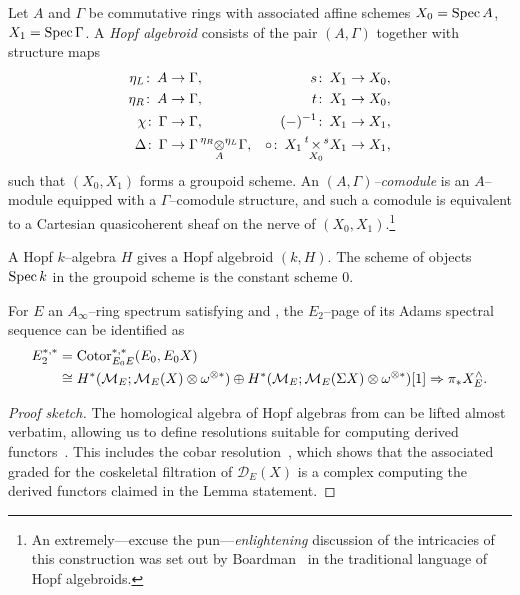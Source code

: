 \begin{definition}\label{FHGivesComodules}
Let \(A\) and \(\Gamma\) be commutative rings with associated affine schemes \(X_0 = \operatorname{Spec} A\), \(X_1 = \operatorname{Spec} \Gamma\).  A \textit{Hopf algebroid} consists of the pair \((A, \Gamma)\) together with structure maps
\begin{align*}
\eta_L \co A & \to \Gamma, & s\co X_1 & \to X_0, \\
\eta_R \co A & \to \Gamma, & t\co X_1 & \to X_0, \\
\chi \co \Gamma & \to \Gamma, & (-)^{-1}\co X_1 & \to X_1, \\
\Delta \co \Gamma & \to \Gamma \presuper{\eta_R}{\underset{A}\otimes}^{\eta_L} \Gamma, & \circ\co X_1 \presuper{t}{\underset{X_0}{\times}}^{s} X_1 & \to X_1,
\end{align*}
such that \((X_0, X_1)\) forms a groupoid scheme.  An \textit{\((A, \Gamma)\)--comodule} is an \(A\)--module equipped with a \(\Gamma\)--comodule structure, and such a comodule is equivalent to a Cartesian quasicoherent sheaf on the nerve of \((X_0, X_1)\).\footnote{An extremely---excuse the pun---\emph{enlightening} discussion of the intricacies of this construction was set out by Boardman~\cite{BoardmanEightfoldWay} in the traditional language of Hopf algebroids.}
\end{definition}

\begin{example}
A Hopf \(k\)--algebra \(H\) gives a Hopf algebroid \((k, H)\).  The scheme of objects \(\operatorname{Spec} k\) in the groupoid scheme is the constant scheme \(0\).
\end{example}

\begin{lemma}\label{IdentifyingAdamsE2Page}
For \(E\) an \(A_\infty\)--ring spectrum satisfying {\CH} and {\FH}, the \(E_2\)--page of its Adams spectral sequence can be identified as
\begin{align*}
E_2^{*, *} & = \operatorname{Cotor}_{E_0 E}^{*, *}(E_0, E_0 X) \\
& \cong H^*(\mathcal{M}_{E}; \mathcal{M}_{E}(X) \otimes \omega^{\otimes *}) \oplus H^*(\mathcal{M}_{E}; \mathcal{M}_{E}(\Sigma X) \otimes \omega^{\otimes *})[1] \Rightarrow \pi_* X^\wedge_E.
\end{align*}
\end{lemma}
\begin{proof}[Proof sketch]
The homological algebra of Hopf algebras from  can be lifted almost verbatim, allowing us to define resolutions suitable for computing derived functors~\cite[Definition A1.2.3]{RavenelGreenBook}.  This includes the cobar resolution~\cite[Definition A1.2.11]{RavenelGreenBook}, which shows that the associated graded for the coskeletal filtration of \(\mathcal D_E(X)\) is a complex computing the derived functors claimed in the Lemma statement.
\end{proof}


